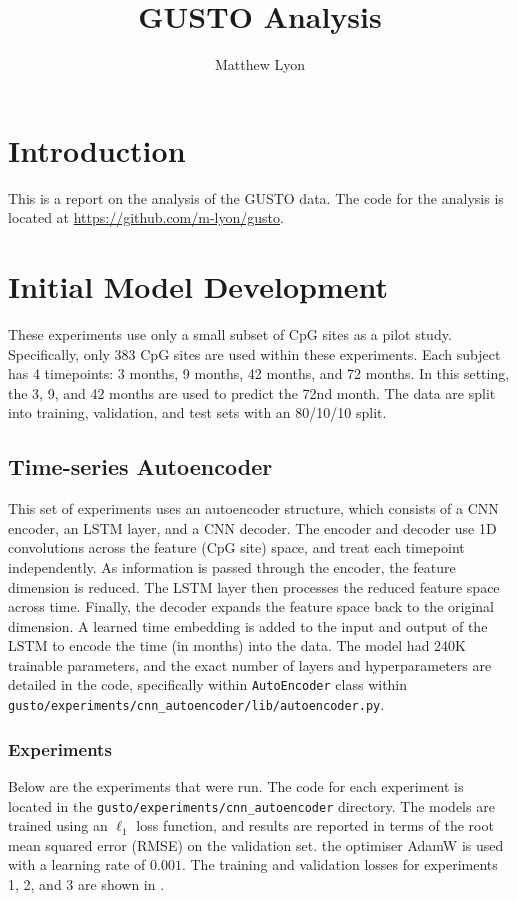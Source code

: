 \documentclass[twocolumn, 9pt]{extarticle}
\begin{document}
\title{GUSTO Analysis}

\author{Matthew Lyon}

\date{}
\maketitle

\section{Introduction}

This is a report on the analysis of the GUSTO data. The code for the analysis is located at \url{https://github.com/m-lyon/gusto}.

\section{Initial Model Development} \label{sec:initial_model}

These experiments use only a small subset of CpG sites as a pilot study. Specifically, only 383 CpG sites are used within these experiments. Each subject has 4 timepoints: 3 months, 9 months, 42 months, and 72 months. In this setting, the 3, 9, and 42 months are used to predict the 72nd month. The data are split into training, validation, and test sets with an 80/10/10 split.

\subsection{Time-series Autoencoder}

This set of experiments uses an autoencoder structure, which consists of a CNN encoder, an LSTM layer, and a CNN decoder. The encoder and decoder use 1D convolutions across the feature (CpG site) space, and treat each timepoint independently. As information is passed through the encoder, the feature dimension is reduced. The LSTM layer then processes the reduced feature space across time. Finally, the decoder expands the feature space back to the original dimension. A learned time embedding is added to the input and output of the LSTM to encode the time (in months) into the data. The model had 240K trainable parameters, and the exact number of layers and hyperparameters are detailed in the code, specifically within \texttt{AutoEncoder} class within \texttt{gusto/experiments/cnn\_autoencoder/lib/autoencoder.py}.

\subsubsection{Experiments}
Below are the experiments that were run. The code for each experiment is located in the \texttt{gusto/experiments/cnn\_autoencoder} directory. The models are trained using an $\ell_{1}$ loss function, and results are reported in terms of the root mean squared error (RMSE) on the validation set. the optimiser AdamW is used with a learning rate of $0.001$. The training and validation losses for experiments 1, 2, and 3 are shown in .
\end{document}
